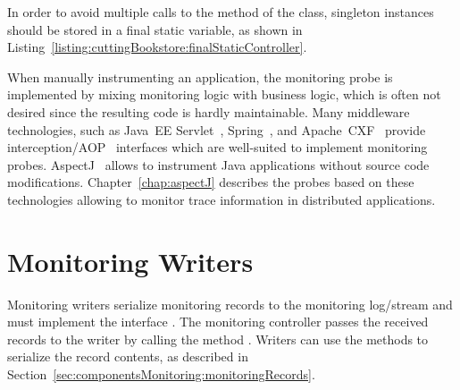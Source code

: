 

\noindent In order to avoid multiple calls to the  method of the %
 class, singleton instances should be stored %
in a final static variable, as shown in Listing~\ref{listing:cuttingBookstore:finalStaticController}.



\noindent When manually instrumenting an application, the monitoring probe is implemented %
by mixing monitoring logic with business logic, which is often not desired since %
the resulting code is hardly maintainable. %
Many middleware technologies, such as Java~EE Servlet~\cite{JavaServletTechnology-WebSite}, %
Spring~\cite{Spring-WebSite}, and %
Apache~CXF~\cite{CXF-WebSite} provide interception/AOP~\cite{Kiczales1997} interfaces %
which are well-suited to implement monitoring probes. AspectJ~\cite{AspectJ-WebSite} allows to %
instrument Java applications without source code modifications. %
Chapter~\ref{chap:aspectJ} describes the \Kieker{} probes based on these technologies allowing to %
monitor trace information in distributed applications. 

\section{Monitoring Writers}\label{sec:monitoring-log-writers}

Monitoring writers serialize monitoring records to the monitoring log/stream and  %
must implement the interface . The monitoring %
controller passes the received records to the writer by calling the method %
. Writers can use the methods to serialize the %
record contents, as described in Section~\ref{sec:componentsMonitoring:monitoringRecords}. 

